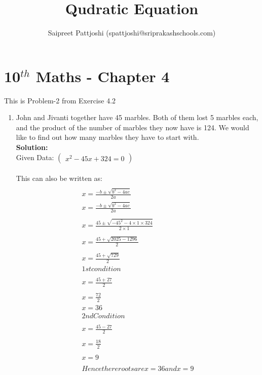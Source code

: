 \documentclass[12pt]{article}
\title{Qudratic Equation}
\author{Saipreet Pattjoshi (spattjoshi@sriprakashschools.com)}
\newcommand{\myvec}[1]{\ensuremath{\begin{pmatrix}#1\end{pmatrix}}}
\newcommand{\solution}{\noindent \textbf{Solution: }}
\begin{document}
\maketitle
\section*{10$^{th}$ Maths - Chapter 4}
This is Problem-2 from Exercise 4.2
\begin{enumerate}
\item John and Jivanti together have 45 marbles. Both of them lost 5 marbles each, and the product of the number of marbles they now have is 124. We would like to find out how many marbles they have to start with. \\
\solution \\
Given Data:
\myvec{x^2-45x+324=0}\\
\\This can also be written as:
\begin{align}
\\{x=\frac{-b\pm\sqrt{b^2-4ac}}{2a}}
\\x=\frac{-b\pm\sqrt{b^2-4ac}}{2a}\\
\\{x=\frac{45\pm\sqrt{-45^2-4 \times 1\times324}}{2 \times 1}}\\
\\{x=\frac{45+\sqrt{2025-1296}}{2}}\\
\\{x=\frac{45+\sqrt{729}}{2}}
\\1st condition\\
\\{x=\frac{45+27}{2}}\\
\\{x=\frac{72}{2}}\\
x=36
\\2nd Condition\\
\\{x=\frac{45-27}{2}}\\
\\{x=\frac{18}{2}}\\
\\x=9\\
\\ Hence there roots are x=36 and x=9\\
\end{align}
	

\end{enumerate}
\end{document}
